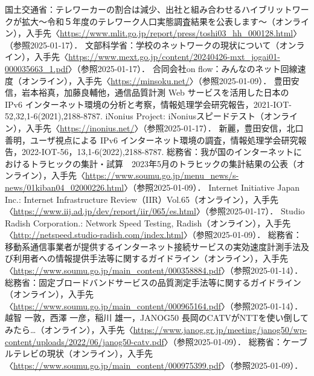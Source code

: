 

\begin{thebibliography}{99}

     国土交通省：テレワーカーの割合は減少、出社と組み合わせるハイブリットワークが拡大～令和５年度のテレワーク人口実態調査結果を公表します～（オンライン），入手先〈\url{https://www.mlit.go.jp/report/press/toshi03_hh_000128.html}〉（参照2025-01-17）．
     文部科学省：学校のネットワークの現状について（オンライン），入手先〈\url{https://www.mext.go.jp/content/20240426-mxt_jogai01-000035663_1.pdf}〉（参照2025-01-17）．
     合同会社on flow：みんなのネット回線速度（オンライン），入手先〈\url{https://minsoku.net/}〉（参照2025-01-09）．
     豊田安信，岩本裕真，加藤良輔他，通信品質計測 Web サービスを活用した日本の IPv6 インターネット環境の分析と考察，情報処理学会研究報告，2021-IOT-52,32,1-6(2021),2188-8787.
     iNonius Project: iNoniusスピードテスト（オンライン），入手先〈\url{https://inonius.net/}〉（参照2025-01-17）．
     新麗，豊田安信，北口善明，ユーザ視点による IPv6 インターネット環境の調査，情報処理学会研究報告，2022-IOT-56，13,1-6(2022),2188-8787.
     総務省：我が国のインターネットにおけるトラヒックの集計・試算　2023年5月のトラヒックの集計結果の公表（オンライン），入手先〈\url{https://www.soumu.go.jp/menu_news/s-news/01kiban04_02000226.html}〉（参照2025-01-09）．
     Internet Initiative Japan Inc.: Internet Infrastructure Review（IIR）Vol.65（オンライン），入手先〈\url{https://www.iij.ad.jp/dev/report/iir/065/es.html}〉（参照2025-01-17）．
    Studio Radish Corporation.: Network Speed Testing, Radish（オンライン），入手先〈\url{http://netspeed.studio-radish.com/index.html}〉（参照2025-01-09）．
     総務省：移動系通信事業者が提供するインターネット接続サービスの実効速度計測手法及び利用者への情報提供手法等に関するガイドライン（オンライン），入手先〈\url{https://www.soumu.go.jp/main_content/000358884.pdf}〉（参照2025-01-14）．
     総務省：固定ブロードバンドサービスの品質測定手法等に関するガイドライン（オンライン），入手先〈\url{https://www.soumu.go.jp/main_content/000965164.pdf}〉（参照2025-01-14）．
     越智 一敦，西澤 一彦，稲川 雄一，JANOG50 長岡のCATVがNTTを使い倒してみたら…（オンライン），入手先〈\url{https://www.janog.gr.jp/meeting/janog50/wp-content/uploads/2022/06/janog50-catv.pdf}〉（参照2025-01-09）．
     総務省：ケーブルテレビの現状（オンライン），入手先〈\url{https://www.soumu.go.jp/main_content/000975399.pdf}〉（参照2025-01-09）．

\end{thebibliography}
